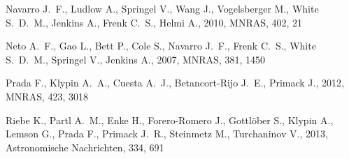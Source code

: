 \documentclass[a4,useAMS,usenatbib,usegraphicx]{mn2e}
\newcommand{\mnras}{MNRAS}
\begin{document}
\begin{thebibliography}{}
{Navarro} J.~F.,  {Ludlow} A.,  {Springel} V.,  {Wang} J.,  {Vogelsberger} M.,
  {White} S.~D.~M.,  {Jenkins} A.,  {Frenk} C.~S.,    {Helmi} A.,  2010,
  \mnras, 402, 21

{Neto} A.~F.,  {Gao} L.,  {Bett} P.,  {Cole} S.,  {Navarro} J.~F.,  {Frenk}
  C.~S.,  {White} S.~D.~M.,  {Springel} V.,    {Jenkins} A.,  2007, \mnras,
  381, 1450

{Prada} F.,  {Klypin} A.~A.,  {Cuesta} A.~J.,  {Betancort-Rijo} J.~E.,
  {Primack} J.,  2012, \mnras, 423, 3018

{Riebe} K.,  {Partl} A.~M.,  {Enke} H.,  {Forero-Romero} J.,  {Gottl{\"o}ber}
  S.,  {Klypin} A.,  {Lemson} G.,  {Prada} F.,  {Primack} J.~R.,  {Steinmetz}
  M.,    {Turchaninov} V.,  2013, Astronomische Nachrichten, 334, 691

\end{thebibliography}
\end{document}
